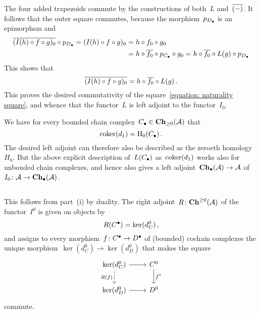 The four added trapezoids commute by the constructions of both~$L$ and~$\overline{(-)}$.
It follows that the outer square commutes, because the morphism~$p_{D_\bullet}$ is an epimorphsm and
\begin{align*}
      \overline{ (I(h) \circ f \circ g)_0 } \circ p_{D_\bullet}
   =  (I(h) \circ f \circ g)_0
  &=  h \circ f_0 \circ g_0 \\
  &=  h \circ \overline{f_0} \circ p_{C_\bullet} \circ g_0
   =  h \circ \overline{f_0} \circ L(g) \circ p_{D_\bullet}
\end{align*}
This shows that
\[
    \overline{ (I(h) \circ f \circ g)_0 }
  = h \circ \overline{f_0} \circ L(g) \,.
\]
This proves the desired commutativity of the square~\eqref{equation: naturality square}, and whence that the functor~$L$ is left adjoint to the functor~$I_0$.

\begin{remark}
  We have for every bounded chain complex~$C_\bullet \in \mathbf{Ch}_{\geq 0}(\mathcal{A})$ that
  \[
    \operatorname{coker}(d_1)
    =
    \operatorname{H}_0(C_\bullet) \,.
  \]
  The desired left adjoint can therefore also be described as the zeroeth homology~$H_0$.
  But the above explicit description of~$L(C_\bullet)$ as~$\operatorname{coker}(d_1)$ works also for unbouded chain complexes, and hence also gives a left adjoint~$\mathbf{Ch}_\bullet(\mathcal{A}) \to \mathcal{A}$ of~$I_0 \colon \mathcal{A} \to \mathbf{Ch}_\bullet(\mathcal{A})$.
\end{remark}





\subsection{}

This follows from part~(i) by duality.
The right adjoint~$R \colon \mathbf{Ch}^{\geq 0}(\mathcal{A})$ of the functor~$I^0$ is given on objects by
\[
    R(C^\bullet)
  = \ker(d_C^0) \,,
\]
and assigns to every morphism~$f \colon C^\bullet \to D^\bullet$ of (bounded) cochain complexes the unique morphism~$\ker(d_C^0) \to \ker(d_D^0)$ that makes the square
\[
  \begin{tikzcd}
      \ker(d_C^0)
      \arrow{r}
      \arrow[dashed]{d}[left]{R(f)}
    & C^0
      \arrow{d}[right]{f^0}
    \\
      \ker(d_D^0)
      \arrow{r}
    & D^0
  \end{tikzcd}
\]
commute.




